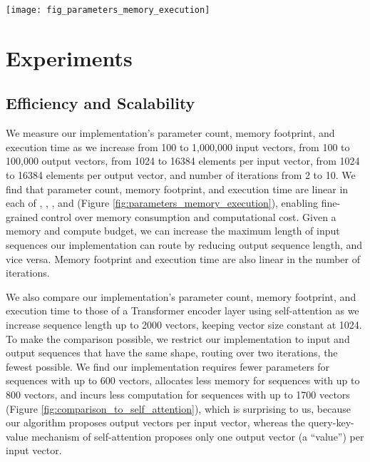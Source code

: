\documentclass[11pt,a4paper]{article}
\begin{document}
\begin{figure*}[t]
	\vskip 0.1in
	\begin{center}
		\centerline{\texttt{[image: fig\_parameters\_memory\_execution]}}
		\caption{Parameter count, memory footprint, and execution time of a forward pass as we vary each of , , , , and , while keeping the others constant at a baseline, at 32-bit precision, keeping track of gradients, on a recent hardware accelerator (GPU). Baseline values are 100, 100, 1024, 1024, and 2, respectively. Memory figures are peak allocations.}
		\label{fig:parameters_memory_execution}
	\end{center}
	\vskip -0.2in
\end{figure*}

\section{Experiments}\label{sec:experiments}

\subsection{Efficiency and Scalability}

We measure our implementation's parameter count, memory footprint, and execution time as we increase  from 100 to 1,000,000 input vectors,  from 100 to 100,000 output vectors,  from 1024 to 16384 elements per input vector,  from 1024 to 16384 elements per output vector, and number of iterations  from 2 to 10. We find that parameter count, memory footprint, and execution time are linear in each of , , , and  (Figure \ref{fig:parameters_memory_execution}), enabling fine-grained control over memory consumption and computational cost. Given a memory and compute budget, we can increase the maximum length of input sequences our implementation can route by reducing output sequence length, and vice versa. Memory footprint and execution time are also linear in the number of iterations.

We also compare our implementation's parameter count, memory footprint, and execution time to those of a Transformer encoder layer using self-attention as we increase sequence length up to 2000 vectors, keeping vector size constant at 1024. To make the comparison possible, we restrict our implementation to input and output sequences that have the same shape, routing over two iterations, the fewest possible. We find our implementation requires fewer parameters for sequences with up to 600 vectors, allocates less memory for sequences with up to 800 vectors, and incurs less computation for sequences with up to 1700 vectors (Figure \ref{fig:comparison_to_self_attention}), which is surprising to us, because our algorithm proposes  output vectors per input vector, whereas the query-key-value mechanism of self-attention proposes only one output vector (a ``value'') per input vector.
\end{document}
